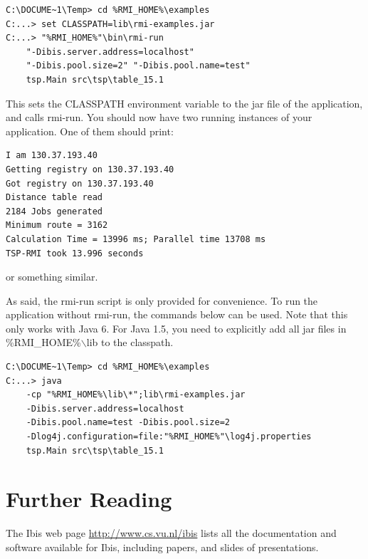 \documentclass[a4paper,10pt]{article}
\begin{document}
\noindent
{\small
\begin{verbatim}
C:\DOCUME~1\Temp> cd %RMI_HOME%\examples
C:...> set CLASSPATH=lib\rmi-examples.jar
C:...> "%RMI_HOME%"\bin\rmi-run
    "-Dibis.server.address=localhost"
    "-Dibis.pool.size=2" "-Dibis.pool.name=test"
    tsp.Main src\tsp\table_15.1
\end{verbatim}
}
\noindent

This sets the CLASSPATH environment variable to the jar file of the
application, and calls rmi-run. You should now have two running
instances of your application. One of them should print:

\noindent
{\small
\begin{verbatim}
I am 130.37.193.40
Getting registry on 130.37.193.40
Got registry on 130.37.193.40
Distance table read
2184 Jobs generated
Minimum route = 3162
Calculation Time = 13996 ms; Parallel time 13708 ms
TSP-RMI took 13.996 seconds
\end{verbatim}
}
\noindent

or something similar.

As said, the rmi-run script is only provided for convenience. To run
the application without rmi-run, the commands below can be used.
Note that this only works with Java 6. For Java 1.5, you need to
explicitly add all jar files in \%RMI\_HOME\%$\backslash$lib to the classpath.

\noindent
{\small
\begin{verbatim}
C:\DOCUME~1\Temp> cd %RMI_HOME%\examples
C:...> java
    -cp "%RMI_HOME%\lib\*";lib\rmi-examples.jar
    -Dibis.server.address=localhost
    -Dibis.pool.name=test -Dibis.pool.size=2
    -Dlog4j.configuration=file:"%RMI_HOME%"\log4j.properties
    tsp.Main src\tsp\table_15.1
\end{verbatim}
}
\noindent

\section{Further Reading}

The Ibis web page \url{http://www.cs.vu.nl/ibis} lists all
the documentation and software available for Ibis, including papers, and
slides of presentations.
\end{document}
